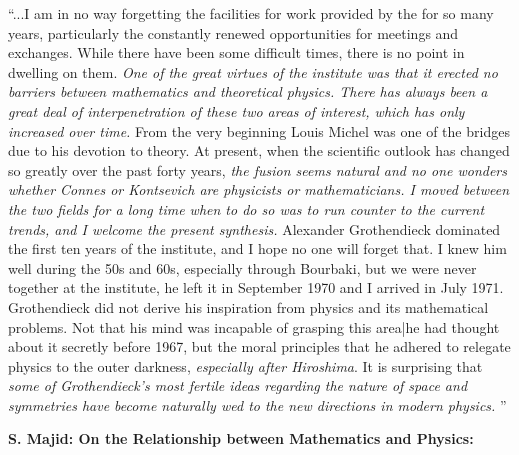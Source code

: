 \documentclass[12pt]{article}
\theoremstyle{plain}
\theoremstyle{definition}
\numberwithin{equation}{section}
\begin{document}
``...I am in no way forgetting the facilities for work provided by the
 for so many years, particularly the constantly renewed opportunities for meetings and exchanges. While there have
been some difficult times, there is no point in dwelling on them.
\emph{One of the great virtues of the institute was that it erected no barriers between
mathematics and theoretical physics. There has always been a great deal of interpenetration
of these two areas of interest, which has only increased over time.}
From the very beginning Louis Michel was one of the bridges due to his devotion to
 theory. At present, when the scientific outlook has changed so greatly over
the past forty years, \emph{the fusion seems natural and no one wonders whether Connes
or Kontsevich are physicists or mathematicians. I moved between the two fields for a long time when to do so was to run counter to the current trends, and I welcome the present synthesis.} Alexander Grothendieck dominated the first ten years of the institute, and I hope no one will forget that. I knew him well during the 50s and 60s, especially through Bourbaki, but we were never together at the institute, he left it in September 1970 and I arrived in July 1971. Grothendieck did not derive his inspiration from physics and its mathematical problems. Not that his mind was incapable of grasping this area|he had thought about it secretly before 1967, but the moral principles that he adhered to relegate physics to the outer darkness, \emph{especially after Hiroshima}.
It is surprising that \emph{some of Grothendieck's most fertile ideas regarding the nature of space and symmetries have become naturally wed to the new directions in modern physics.} ''


\textbf{S. Majid: On the Relationship between Mathematics and Physics:}
\end{document}
